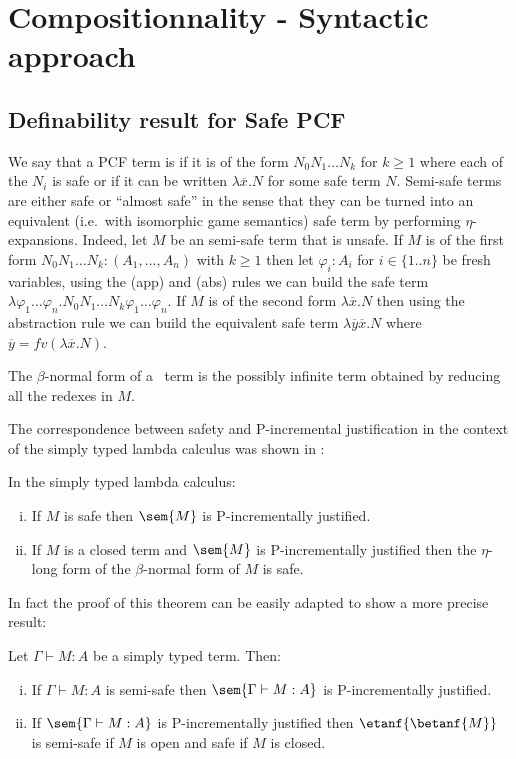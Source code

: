 \section{Compositionnality - Syntactic approach}

\subsection{Definability result for Safe PCF}

We say that a PCF term is  if it is of the form $N_0 N_1 \ldots N_k$ for $k\geq 1$ where each of the $N_i$ is safe or if it can be written $\lambda \overline{x} . N$ for some safe term $N$. Semi-safe terms are either safe or ``almost safe'' in the sense that they can be turned into an equivalent (i.e.~with isomorphic game semantics) safe term  by performing $\eta$-expansions. Indeed, let $M$ be an semi-safe term that is unsafe.
If $M$ is of the first form $N_0 N_1 \ldots N_k : (A_1,\ldots,A_n)$ with $k\geq 1$ then let $\varphi_i:A_i$ for $i\in\{1..n\}$ be fresh variables, using the (app) and (abs) rules we can build the safe term $\lambda \varphi_1 \ldots \varphi_n . N_0 N_1 \ldots N_k \varphi_1 \ldots \varphi_n$. If $M$ is of the second form $\lambda \overline{x} . N$ then using the abstraction rule we can build the equivalent safe term $\lambda \overline{y} \overline{x}. N$  where $\overline{y} = fv(\lambda \overline{x}. N)$.

The $\beta$-normal form of a \pcf\ term is the possibly infinite term obtained by reducing all the redexes in $M$.

The correspondence between safety and P-incremental justification in the context of the simply typed lambda calculus was shown
in \cite[Theorem 3(ii)]{blumong:safelambdacalculus}:

\begin{theorem}
\label{thm:safeincrejust} In the simply typed lambda calculus:
\begin{enumerate}[(i)]
\item If $M$ is safe then $\sem{M}$ is P-incrementally justified.
\item If $M$ is a closed term and $\sem{M}$ is
  P-incrementally justified then the $\eta$-long form of the
  $\beta$-normal form of $M$ is safe.
\end{enumerate}
\end{theorem}
In fact the proof of this theorem can be easily adapted to show a more precise result:
\begin{theorem}
\label{thm:semisafeincrejust} Let $\Gamma \vdash M : A$ be a simply typed term. Then:
\begin{enumerate}[(i)]
\item If $\Gamma \vdash M : A$ is semi-safe then $\sem{\Gamma \vdash M : A}$ is P-incrementally justified.
\item If $\sem{\Gamma \vdash M : A}$ is
  P-incrementally justified then
$\etanf{\betanf{M}}$ is semi-safe if $M$ is open
and safe if $M$ is closed.
\end{enumerate}
\end{theorem}



